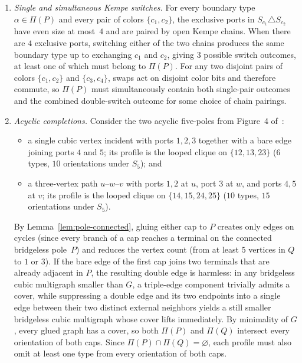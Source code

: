 \documentclass[11pt]{article}
\theoremstyle{remark}
\begin{document}
\begin{enumerate}
  \item \emph{Single and simultaneous Kempe switches.} For every boundary type
        $\alpha \in \Pi(P)$ and every pair of colors $\{c_1, c_2\}$, the exclusive ports
        in $S_{c_1} \triangle S_{c_2}$ have even size at most~$4$ and are paired by open
        Kempe chains. When there are $4$ exclusive ports, switching either of the two
        chains produces the same boundary type up to exchanging $c_1$ and $c_2$, giving
        $3$ possible switch outcomes, at least one of which must belong to $\Pi(P)$. For
        any two disjoint pairs of colors $\{c_1,c_2\}$ and $\{c_3,c_4\}$, swaps act on
        disjoint color bits and therefore commute, so $\Pi(P)$ must simultaneously
        contain both single-pair outcomes and the combined double-switch outcome for some
        choice of chain pairings.
  \item \emph{Acyclic completions.} Consider the two acyclic five-poles from Figure~4
        of~\cite{MMT}:
        \begin{itemize}
          \item a single cubic vertex incident with ports $1,2,3$ together with a bare
                edge joining ports $4$ and $5$; its profile is the looped clique on
                $\{12, 13, 23\}$ ($6$ types, $10$ orientations under $S_5$); and
          \item a three-vertex path $u\text{--}w\text{--}v$ with ports $1,2$ at $u$,
                port $3$ at $w$, and ports $4,5$ at $v$; its profile is the looped clique
                on $\{14, 15, 24, 25\}$ ($10$ types, $15$ orientations under $S_5$).
        \end{itemize}
        By Lemma~\ref{lem:pole-connected}, gluing either cap to $P$ creates only edges on
        cycles (since every branch of a cap reaches a terminal on the connected bridgeless
        pole~$P$) and reduces the vertex count (from at least $5$ vertices in $Q$ to $1$
        or $3$). If the bare edge of the first cap joins two terminals that are already
        adjacent in $P$, the resulting double edge is harmless: in any bridgeless cubic
        multigraph smaller than $G$, a triple-edge component trivially admits a cover,
        while suppressing a double edge and its two endpoints into a single edge between
        their two distinct external neighbors yields a still smaller bridgeless cubic
        multigraph whose cover lifts immediately. By minimality of $G$, every glued graph
        has a cover, so both $\Pi(P)$ and $\Pi(Q)$ intersect every orientation of both
        caps. Since $\Pi(P) \cap \Pi(Q) = \varnothing$, each profile must also omit at
        least one type from every orientation of both caps.
\end{enumerate}
\end{document}
